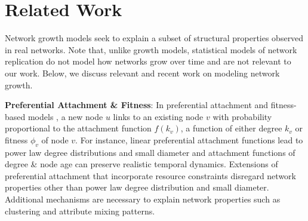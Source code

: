 \section{Related Work}
\label{sec:Related Work}
Network growth models seek to explain a subset of structural properties observed in real
networks.
Note that, unlike growth models, statistical models of network replication \cite{leskovec2010kronecker,pfeiffer2014attributed}
do not model how networks grow over time and are not relevant to our work.
Below, we discuss relevant and recent work on modeling network growth.

\textbf{Preferential Attachment \& Fitness}:
In preferential attachment and fitness-based models \cite{bell2017network,medo2011temporal,bianconi2001bose,caldarelli2002scale}, a new node $u$ links to an existing node $v$
with probability proportional to the attachment function $f(k_v)$, a function of
either degree $k_v$ or fitness $\phi_v$ of node $v$.
For instance, linear preferential attachment functions
\cite{barabasi1999emergence,kumar2000stochastic,dorogovtsev2000structure} lead to
power law degree distributions and small diameter \cite{bollobas2004diameter}
and attachment functions of degree \& node age \cite{wang2013quantifying}
can preserve realistic temporal dynamics.
Extensions of preferential
attachment \cite{mossa2002truncation,zeng2005construction,wang2009local} that
incorporate resource constraints
disregard network properties other than power law degree distribution and small diameter.
Additional mechanisms are necessary to explain network properties
such as clustering and attribute mixing patterns.


